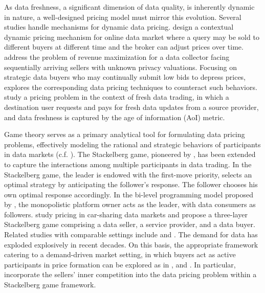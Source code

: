 \documentclass[11pt]{article}
\numberwithin{equation}{section}
\begin{document}
As data freshness, a significant dimension of data quality, is inherently dynamic in nature, a well-designed pricing model must mirror this evolution. Several studies handle mechanisms for dynamic data pricing. \cite{NZ20} design a contextual dynamic pricing mechanism for online data market where a query may be sold to  different buyers at different time and the broker can adjust prices over time. \cite{XJ16} address the problem of revenue maximization for a data collector facing sequentially arriving sellers with unknown privacy valuations. %
Focusing on strategic data buyers who may continually submit low bids to depress prices, \cite{C22} explores the corresponding data pricing techniques to counteract such behaviors. \cite{ZA21} study a pricing problem in the context of fresh data trading, in which a destination user requests and pays for fresh data updates from a source provider, and data freshness is captured by the age of information (AoI) metric. 
		
Game theory serves as a primary analytical tool for formulating data pricing problems, effectively modeling the rational and strategic behaviors of participants in data markets (c.f. \cite{BW24}). The Stackelberg game, pioneered by \cite{V52},  has been extended to capture the interactions among multiple participants in data trading. In the Stackelberg game, the leader is endowed with the first-move priority, selects an optimal strategy by anticipating the follower's response. The follower chooses his own optimal response accordingly. In the bi-level programming model proposed by \cite{Y17}, the monopolistic platform owner acts as the leader, with data consumers as followers. \cite{XZ20} study pricing in car-sharing data markets and propose a three-layer Stackelberg game comprising a data seller, a service provider, and a data buyer. %
Related studies with comparable settings include \cite{ZA21} and \cite{LH23}. The demand for data has exploded explosively in recent decades. On this basis, the appropriate framework catering to a demand-driven market setting, in which buyers act as active participants in price formation can be explored as in \cite{AX21}, \cite{XH21} and \cite{BL24}. In particular,  \cite{BL24} incorporate the sellers' inner competition into the data pricing problem within a Stackelberg game framework.%
		
\end{document}
